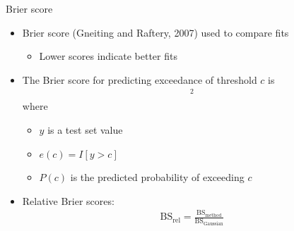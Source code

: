 \documentclass{beamer}
\begin{document}

\begin{frame}{Brier score}
  \begin{itemize} \setlength{\itemsep}{1em}
    \item Brier score (Gneiting and Raftery, 2007) used to compare fits
    \begin{itemize} \setlength{\itemsep}{0.5em}
      \item Lower scores indicate better fits
    \end{itemize}
    \item The Brier score for predicting exceedance of threshold $c$ is
    \begin{align*}
      [e(c) - P(c)]^2
    \end{align*}
    where \vspace{0.25em}
    \begin{itemize} \setlength{\itemsep}{0.25em}
      \item $y$ is a test set value
      \item $e(c) = I[y > c]$
      \item $P(c)$ is the predicted probability of exceeding $c$
    \end{itemize}
    \item Relative Brier scores:
    \begin{align*}
      \text{BS}_\text{rel} = \frac{ \text{BS}_\text{method}}{ \text{BS}_\text{Gaussian}}
    \end{align*}
  \end{itemize}
\end{frame}
\end{document}
